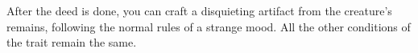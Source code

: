     After the deed is done, you can craft a disquieting artifact from the creature's remains, following the normal rules of a strange mood.
    All the other conditions of the trait remain the same.%


\newpage~\newpage
